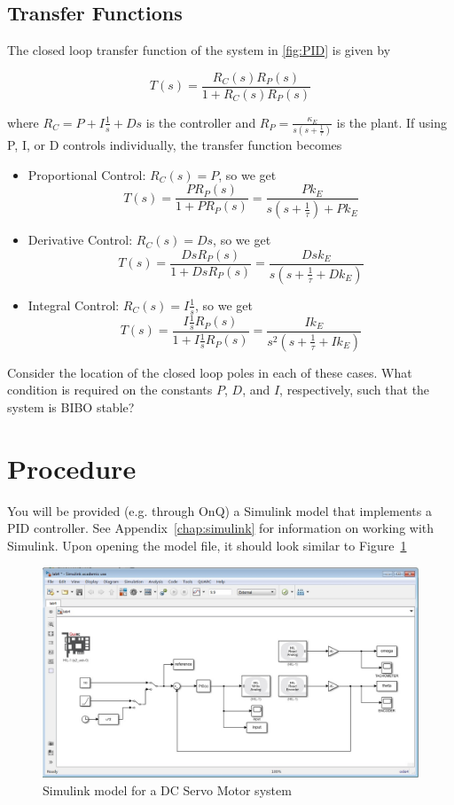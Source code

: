 \subsection{Transfer Functions}
The closed loop transfer function of the system in \ref{fig:PID} is given by

\begin{equation*}\label{eq:transfer}
    T(s)= \frac{R_{C}(s)R_{P}(s)}{1+R_{C}(s)R_{P}(s)}
\end{equation*}

where \( R_C = P + I\frac{1}{s} + Ds \) is the controller and \( R_P = \frac{\kappa_E}{s(s+\frac{1}{\tau})} \) is the plant. If using P, I, or D controls individually, the transfer function becomes

\begin{itemize}
    \item Proportional Control: \( R_C(s) = P \), so we get
          \[ T(s) = \frac{PR_P(s)}{1+PR_P(s)} = \frac{Pk_E}{s(s+\frac{1}{\tau}) + Pk_E} \]
    \item Derivative Control: \( R_C(s) = Ds \), so we get
          \[ T(s) = \frac{DsR_P(s)}{1+DsR_P(s)} = \frac{Dsk_E}{s(s+\frac{1}{\tau}+Dk_E)} \]
    \item Integral Control: \( R_C(s) = I\frac{1}{s} \), so we get
          \[ T(s) = \frac{I\frac{1}{s}R_P(s)}{1+I\frac{1}{s}R_P(s)} = \frac{Ik_E}{s^2(s+\frac{1}{\tau}+Ik_E)} \]
\end{itemize}

Consider the location of the closed loop poles in each of these cases. What condition is required on the constants \(P\), \(D\), and \(I\), respectively, such that the system is BIBO stable?

\section{Procedure}
You will be provided (e.g. through OnQ) a \textsf{Simulink} model that implements a PID controller. See Appendix~\ref{chap:simulink} for information on working with \textsf{Simulink}. Upon opening the model file, it should look similar to Figure~\ref{fig:model6}
\begin{figure}[H]
    \centering
    \includegraphics[width=0.6\hsize]{pix/performanceSpecificationModel4.jpg}
    \caption{\textsf{Simulink} model for a DC Servo Motor
        system}\label{fig:model6}
\end{figure}%

